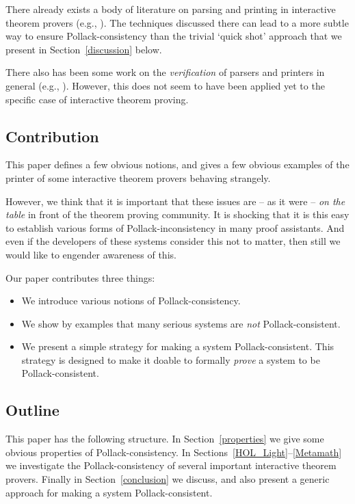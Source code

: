 \documentclass{entcs}
\begin{document}
There already exists a body of literature on parsing and printing
in interactive theorem provers (e.g., \cite{coe:zac:08}).
The techniques discussed there can lead to a more subtle way to ensure
Pollack-consistency than the trivial `quick shot'
approach that we present
in Section~\ref{discussion} below.

There also has been some work on the \emph{verification} of parsers
and printers in general (e.g., \cite{kop:bin:10}).
However, this does not seem to have been applied yet to the
specific case of interactive theorem proving.

\subsection{Contribution}

This paper defines a few obvious notions, and gives a few obvious examples
of the printer
of some interactive theorem provers behaving strangely.

However, we think that it is important that these issues are --
as it were -- \emph{on the table} in front of the theorem proving
community.
It is shocking that it is this easy to establish various forms
of Pollack-inconsistency in many proof assistants.
And even if the developers of these systems consider this
not to matter, then still we would like to engender awareness of this.

Our paper contributes three things:
\begin{itemize}
\item
We introduce various notions of Pollack-consistency.

\item
We show by examples that many serious systems are \emph{not} Pollack-consistent.

\item
We present a simple strategy for making a system Pollack-consistent.
%
This strategy is designed to make it doable to formally \emph{prove}
a system to be Pollack-consistent.

\end{itemize}

\subsection{Outline}

This paper has the following structure.
In Section~\ref{properties} we give some obvious properties of Pollack-consistency.
In Sections~\ref{HOL_Light}--\ref{Metamath} we investigate the Pollack-consistency
of several important interactive theorem provers.
Finally in Section~\ref{conclusion} we discuss, and also present a generic approach
for making a system Pollack-consistent.
\end{document}
